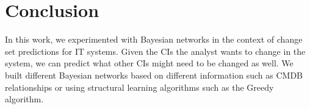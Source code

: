 \documentclass[10pt,twocolumn,letterpaper]{article}
\begin{document}
\section{Conclusion}
\label{concl}

In this work, we experimented with Bayesian networks in the context of change set predictions for IT systems. Given the CIs the analyst wants to change in the
system, we can predict what other CIs might need to be changed as well. We built different Bayesian networks based on different information such as CMDB
relationships or using structural learning algorithms such as the Greedy algorithm.




\end{document}
